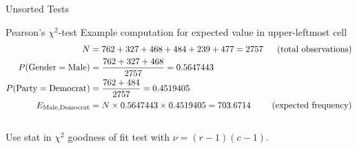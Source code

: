 \documentclass{article}
\begin{document}
\begin{section}{Unsorted Tests}
\begin{subsection}{Pearson's $\chi^2$-test}
\noindent Example computation for expected value in upper-leftmost cell
\begin{align}
N &= 762 + 327 + 468 + 484 + 239 + 477 = 2757 & \text{(total observations)} 
\notag\\ 
P(\mathrm{Gender} = \mathrm{Male}) &= \frac{762+327+468}{2757} = 0.5647443 &
\notag\\
P(\mathrm{Party}= \mathrm{Democrat}) &= \frac{762+484}{2757} = 0.4519405 
\notag\\
E_{\mathrm{Male},\mathrm{Democrat}} &= N \times 0.5647443 \times 0.4519405 
= 703.6714 & \text{(expected frequency)}\notag
\end{align}\\

\noindent Use stat in $\chi^2$ goodness of fit test with $\nu = (r-1)(c-1)$.
\end{subsection}
\end{section}
\end{document}
